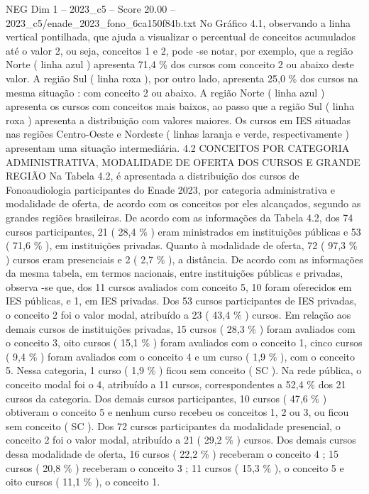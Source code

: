 \begin{textsample}{NEG Dim 1 – 2023\_c5 – Score 20.00 – 2023\_c5/enade\_2023\_fono\_6ca150f84b.txt}
No Gráfico 4.1, observando a linha vertical pontilhada, que ajuda a visualizar o percentual de conceitos acumulados até o valor 2, ou seja, conceitos 1 e 2, pode -se notar, por exemplo, que a região Norte ( linha azul ) apresenta 71,4 \% dos cursos com conceito 2 ou abaixo deste valor.
A região Sul ( linha roxa ), por outro lado, apresenta 25,0 \% dos cursos na mesma situação : com conceito 2 ou abaixo.
A região Norte ( linha azul ) apresenta os cursos com conceitos mais baixos, ao passo que a região Sul ( linha roxa ) apresenta a distribuição com valores maiores.
Os cursos em IES situadas nas regiões Centro-Oeste e Nordeste ( linhas laranja e verde, respectivamente ) apresentam uma situação intermediária. 4.2 CONCEITOS POR CATEGORIA ADMINISTRATIVA, MODALIDADE DE OFERTA DOS CURSOS E GRANDE REGIÃO Na Tabela 4.2, é apresentada a distribuição dos cursos de Fonoaudiologia participantes do Enade 2023, por categoria administrativa e modalidade de oferta, de acordo com os conceitos por eles alcançados, segundo as grandes regiões brasileiras.
De acordo com as informações da Tabela 4.2, dos 74 cursos participantes, 21 ( 28,4 \% ) eram ministrados em instituições públicas e 53 ( 71,6 \% ), em instituições privadas.
Quanto à modalidade de oferta, 72 ( 97,3 \% ) cursos eram presenciais e 2 ( 2,7 \% ), a distância.
De acordo com as informações da mesma tabela, em termos nacionais, entre instituições públicas e privadas, observa -se que, dos 11 cursos avaliados com conceito 5, 10 foram oferecidos em IES públicas, e 1, em IES privadas.
Dos 53 cursos participantes de IES privadas, o conceito 2 foi o valor modal, atribuído a 23 ( 43,4 \% ) cursos.
Em relação aos demais cursos de instituições privadas, 15 cursos ( 28,3 \% ) foram avaliados com o conceito 3, oito cursos ( 15,1 \% ) foram avaliados com o conceito 1, cinco cursos ( 9,4 \% ) foram avaliados com o conceito 4 e um curso ( 1,9 \% ), com o conceito 5.
Nessa categoria, 1 curso ( 1,9 \% ) ficou sem conceito ( SC ).
Na rede pública, o conceito modal foi o 4, atribuído a 11 cursos, correspondentes a 52,4 \% dos 21 cursos da categoria.
Dos demais cursos participantes, 10 cursos ( 47,6 \% ) obtiveram o conceito 5 e nenhum curso recebeu os conceitos 1, 2 ou 3, ou ficou sem conceito ( SC ).
Dos 72 cursos participantes da modalidade presencial, o conceito 2 foi o valor modal, atribuído a 21 ( 29,2 \% ) cursos.
Dos demais cursos dessa modalidade de oferta, 16 cursos ( 22,2 \% ) receberam o conceito 4 ; 15 cursos ( 20,8 \% ) receberam o conceito 3 ; 11 cursos ( 15,3 \% ), o conceito 5 e oito cursos ( 11,1 \% ), o conceito 1.

\end{textsample}
